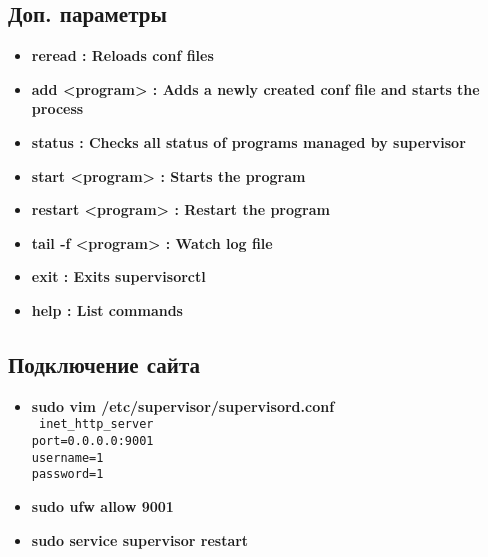 \documentclass[14pt,a4paper,oneside]{extarticle}
\begin{document}
        \subsection{Доп. параметры}
            \begin{itemize}
                \item \textbf{reread : Reloads conf files}
                \item \textbf{add <program> : Adds a newly created conf file and starts the process}
                \item \textbf{status : Checks all status of programs managed by supervisor}
                \item \textbf{start <program> : Starts the program}
                \item \textbf{restart <program> : Restart the program}
                \item \textbf{tail -f <program> : Watch log file}
                \item \textbf{exit : Exits supervisorctl}
                \item \textbf{help : List commands}
            \end{itemize}

        \subsection{Подключение сайта}
        
            \begin{itemize}
                \item \textbf{sudo vim /etc/supervisor/supervisord.conf} \\
                \texttt{ 
                    \lbrack inet\_http\_server\rbrack\\
                    port=0.0.0.0:9001\\
                    username=1\\
                    password=1
                }
                \item \textbf{sudo ufw allow 9001}
                \item \textbf{sudo service supervisor restart}
            \end{itemize}
\end{document}
